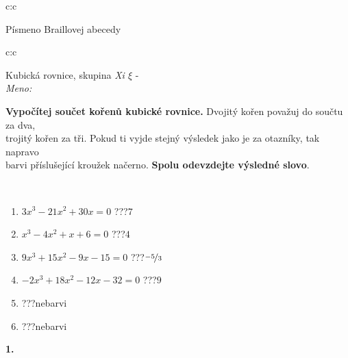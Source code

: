 \documentclass[10pt]{report}
\begin{document}
\begin{tabular}{c:c}
\begin{minipage}[c][104.5mm][t]{0.5\linewidth}
\begin{center}
\begin{minipage}{0.20\linewidth}
\begin{center}
{\small Písmeno Braillovej abecedy}
\end{center}
\end{minipage}
\end{center}
\end{minipage}
%
\end{tabular}
\newpage
\thispagestyle{empty}
\begin{tabular}{c:c}
\begin{minipage}[c][104.5mm][t]{0.5\linewidth}
\begin{center}
\vspace{7mm}
{\huge Kubická rovnice, skupina \textit{Xi $\xi$} -}\\[5mm]
\textit{Meno:}\phantom{xxxxxxxxxxxxxxxxxxxxxxxxxxxxxxxxxxxxxxxxxxxxxxxxxxxxxxxxxxxxxxxxx}\\[5mm]
\begin{minipage}{0.95\linewidth}
\textbf{Vypočítej součet kořenů kubické rovnice.} Dvojitý kořen považuj do součtu za dva,\\trojitý kořen za tři. Pokud ti vyjde stejný výsledek jako je za otazníky, tak napravo\\barvi příslušející kroužek načerno. \textbf{Spolu odevzdejte výsledné slovo}.
\end{minipage}
\\[1mm]
\begin{minipage}{0.79\linewidth}
\begin{center}
\begin{varwidth}{\linewidth}
\begin{enumerate}
\Large
\item $3x^3-21x^2+30x=0$\quad \dotfill\; ???\;\dotfill \quad $7$
\item $x^3-4x^2+x+6=0$\quad \dotfill\; ???\;\dotfill \quad $4$
\item $9x^3+15x^2-9x-15=0$\quad \dotfill\; ???\;\dotfill \quad $\nicefrac{-5}{3}$
\item $-2x^3+18x^2-12x-32=0$\quad \dotfill\; ???\;\dotfill \quad $9$
\item \quad \dotfill\; ???\;\dotfill \quad nebarvi
\item \quad \dotfill\; ???\;\dotfill \quad nebarvi
\end{enumerate}
\end{varwidth}
\end{center}
\end{minipage}
\begin{minipage}{0.20\linewidth}
\begin{center}
{\Huge\bfseries 1.} \\[2mm]

\end{center}
\end{minipage}
\end{center}
\end{minipage}
\end{tabular}
\end{document}
